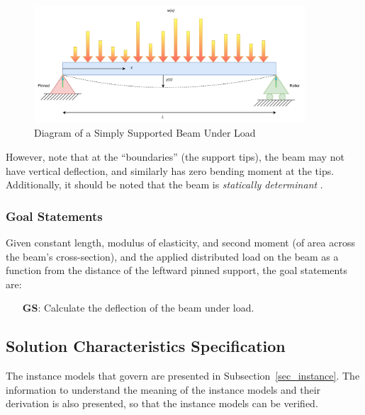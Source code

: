 \documentclass[12pt]{article}
\newcounter{goalnum} %
\begin{document}
\begin{figure}[H]
    \begin{center}
        \includegraphics[width=0.9\textwidth]{diagrams/beam_bending_diagram_annotated.drawio.pdf}
        \caption{\label{beam_bending_diagram_annotated} Diagram of a Simply Supported Beam Under Load}
    \end{center}
\end{figure}

\noindent{}However, note that at the ``boundaries'' (the support tips), the beam
may not have vertical deflection, and similarly has zero bending moment at the
tips. Additionally, it should be noted that the beam is \textit{statically
    determinant} \cite{StaticallyDeterminantWiki}.

\subsubsection{Goal Statements}
\label{sssec_goals}

\noindent{}Given constant length, modulus of elasticity, and second moment (of
area across the beam's cross-section), and the applied distributed load on the
beam as a function from the distance of the leftward pinned support, the goal
statements are:

\begin{itemize}

    \item[\refstepcounter{goalnum}\textbf{GS\thegoalnum{}}\label{deflection}:]
        Calculate the deflection of the beam under load.

\end{itemize}

\subsection{Solution Characteristics Specification}

The instance models that govern \progname{} are presented in
Subsection~\ref{sec_instance}.  The information to understand the meaning of the
instance models and their derivation is also presented, so that the instance
models can be verified.
\end{document}
